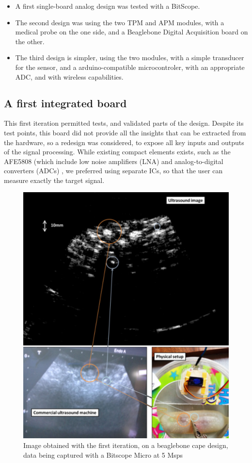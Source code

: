 \documentclass[letterpaper, 10 pt, conference]{ieeeconf} %
\begin{document}
\begin{itemize} 
\item A first single-board analog design was tested with a BitScope.
\item The second design was using the two TPM and APM modules, with a medical probe on the one side, and a Beaglebone Digital Acquisition board on the other.
\item The third design is simpler, using the two modules, with a simple transducer for the sensor, and a arduino-compatible microcontroler, with an appropriate ADC, and with wireless capabilities.
\end{itemize}

\subsection{A first integrated board}

This first iteration permitted tests, and validated parts of the design. Despite its test points, this board did not provide all the insights that can be extracted from the hardware, so a redesign was considered, to expose all key inputs and outputs of the signal processing. While existing compact elements exists, such as the AFE5808 (which include low noise amplifiers (LNA) and analog-to-digital converters (ADCs) \cite{c8}, we preferred using separate ICs, so that the user can measure exactly the target signal.

\begin{figure}%
\centering
\includegraphics[width=.8\linewidth]{3in1}
\caption{Image obtained with the first iteration, on a beaglebone cape design, data being captured with a Bitscope Micro at 5 Msps}
\label{fig:single}
\end{figure}
\end{document}
